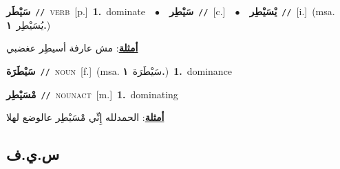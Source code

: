 \documentclass[10pt,a4paper,twoside]{article} %
\begin{document}
\begin{multicols}{2}
{\setlength\topsep{0pt}\textbf{\foreignlanguage{arabic}{سَيْطَر}}\ {\color{gray}\texttt{//}\color{black}}\ \textsc{verb}\ [p.]\ \textbf{1.}~dominate\ \ $\bullet$\ \ \setlength\topsep{0pt}\textbf{\foreignlanguage{arabic}{سَيْطِر}}\ {\color{gray}\texttt{//}\color{black}}\ [c.]\ \ $\bullet$\ \ \setlength\topsep{0pt}\textbf{\foreignlanguage{arabic}{يْسَيْطِر}}\ {\color{gray}\texttt{//}\color{black}}\ [i.]\ \color{gray}(msa. \foreignlanguage{arabic}{يُسَيْطِر}~\foreignlanguage{arabic}{\textbf{١.}})\color{black}\  \begin{flushright}\color{gray}\foreignlanguage{arabic}{\textbf{\underline{\foreignlanguage{arabic}{أمثلة}}}: مش عارفة أسيطِر عغضبي}\end{flushright}\color{black}} \vspace{2mm}

{\setlength\topsep{0pt}\textbf{\foreignlanguage{arabic}{سَيْطَرَة}}\ {\color{gray}\texttt{//}\color{black}}\ \textsc{noun}\ [f.]\ \color{gray}(msa. \foreignlanguage{arabic}{سَيْطَرَة}~\foreignlanguage{arabic}{\textbf{١.}})\color{black}\ \textbf{1.}~dominance\ } \vspace{2mm}

{\setlength\topsep{0pt}\textbf{\foreignlanguage{arabic}{مْسَيْطِر}}\ {\color{gray}\texttt{//}\color{black}}\ \textsc{noun\textunderscore act}\ [m.]\ \textbf{1.}~dominating\  \begin{flushright}\color{gray}\foreignlanguage{arabic}{\textbf{\underline{\foreignlanguage{arabic}{أمثلة}}}: الحمدلله إِنِّي مْسَيْطِر عالوضع لهلا}\end{flushright}\color{black}} \vspace{2mm}

\vspace{-3mm}
\subsection*{\color{blue}\foreignlanguage{arabic}{س.ي.ف}\color{blue}{}} 


\end{multicols}
\end{document}
